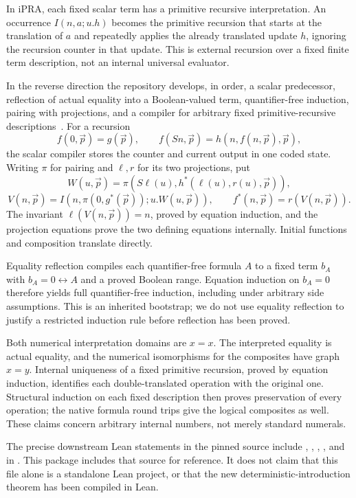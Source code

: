 \documentclass[11pt,letterpaper]{article}
\theoremstyle{definition}\newtheorem{definition}[theorem]{Definition}
\theoremstyle{remark}\newtheorem{remark}[theorem]{Remark}
\begin{document}
In iPRA, each fixed scalar term has a primitive recursive interpretation.
An occurrence $I(n,a;u.h)$ becomes the primitive recursion that starts at the
translation of $a$ and repeatedly applies the already translated update $h$,
ignoring the recursion counter in that update. This is external recursion
over a fixed finite term description, not an internal universal evaluator.

In the reverse direction the repository develops, in order, a scalar
predecessor, reflection of actual equality into a Boolean-valued term,
quantifier-free induction, pairing with projections, and a compiler for
arbitrary fixed primitive-recursive descriptions~\cite{arithmetic}.
For a recursion
\[
 f(0,\vec p)=g(\vec p),\qquad
 f(Sn,\vec p)=h(n,f(n,\vec p),\vec p),
\]
the scalar compiler stores the counter and current output in one coded state.
Writing $\pi$ for pairing and $\ell,r$ for its two projections, put
\[
 W(u,\vec p)=\pi(S\ell(u),h^*(\ell(u),r(u),\vec p)),
\]
\[
 V(n,\vec p)=I(n,\pi(0,g^*(\vec p));u.W(u,\vec p)),
 \qquad f^*(n,\vec p)=r(V(n,\vec p)).
\]
The invariant $\ell(V(n,\vec p))=n$, proved by equation induction,
and the projection equations prove the two defining equations internally.
Initial functions and composition translate directly.

Equality reflection compiles each quantifier-free formula $A$ to a fixed
term $b_A$ with $b_A=0\leftrightarrow A$ and a proved Boolean range. Equation
induction on $b_A=0$ therefore yields full quantifier-free induction,
including under arbitrary side assumptions. This is an inherited bootstrap;
we do not use equality reflection to justify a restricted induction rule
before reflection has been proved.

Both numerical interpretation domains are $x=x$. The interpreted equality
is actual equality, and the numerical isomorphisms for the composites have
graph $x=y$. Internal uniqueness of a fixed primitive recursion, proved by
equation induction, identifies each double-translated operation with the
original one. Structural induction on each fixed description then proves
preservation of every operation; the native formula round trips give the
logical composites as well. These claims concern arbitrary internal numbers,
not merely standard numerals.

The precise downstream Lean statements in the pinned source include
, ,
, , and
 in
. This package includes
that source for reference. It does not claim that this file alone is a
standalone Lean project, or that the new deterministic-introduction theorem
has been compiled in Lean.
\end{document}
